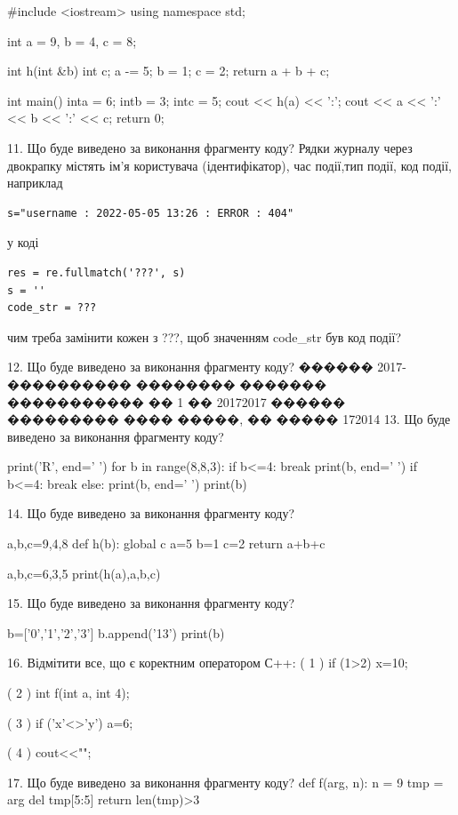 \documentclass[11pt]{article}
\begin{document}
{{%
#include <iostream>
using namespace std;

int a = 9, b = 4, c = 8;

int h(int &b){
int c;    a -= 5;
    b = 1;
    c = 2;
    return a + b + c;
}

int main(){
    inta = 6;
    intb = 3;
    intc = 5;
    cout << h(a) << ':';
    cout << a << ':' << b << ':' << c;
    return 0; 
}

11. Що буде виведено за виконання фрагменту коду?
Рядки журналу через двокрапку містять ім'я користувача (ідентифікатор), час події,тип події, код події, наприклад
\begin{verbatim}
s="username : 2022-05-05 13:26 : ERROR : 404"
\end{verbatim}
у коді 
\begin{verbatim}
res = re.fullmatch('???', s) 
s = ''
code_str = ??? 
\end{verbatim}
чим треба замінити кожен з ???, щоб значенням code\_str був код події? 



12. Що буде виведено за виконання фрагменту коду?
������ 2017-���������� �������� ������� ����������� �� 1 �� 20172017 ������ ��������� ���� �����, �� ����� 172014
13. Що буде виведено за виконання фрагменту коду?

print('R', end=' ')
for b in range(8,8,3):
    if b<=4:
        break
        print(b, end=' ')
    if b<=4:
        break
    else:
        print(b, end=' ')
    print(b)

14. Що буде виведено за виконання фрагменту коду?

a,b,c=9,4,8
def h(b):
global c    a=5
    b=1
    c=2
    return a+b+c

a,b,c=6,3,5
print(h(a),a,b,c)

15. Що буде виведено за виконання фрагменту коду?

b=['0','1','2','3']
b.append('13')
print(b)


16. Відмітити все, що є коректним оператором С++:
( 1 ) if (1>2) x=10;

( 2 ) int f(int a, int 4);

( 3 ) if ('x'<>'y') a=6;

( 4 ) cout<<"\n";

17. Що буде виведено за виконання фрагменту коду?
def f(arg, n):
    n = 9
    tmp = arg
    del tmp[5:5]
    return len(tmp)>3

}}
\end{document}
